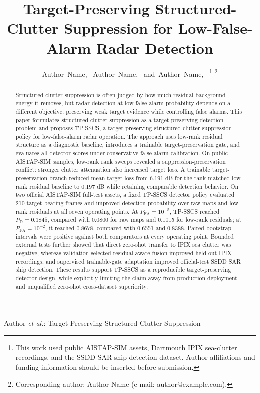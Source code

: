 \documentclass[journal]{IEEEtran}
\begin{document}
\title{Target-Preserving Structured-Clutter Suppression for Low-False-Alarm Radar Detection}

\author{Author~Name,~
        Author~Name,~
        and~Author~Name,~%
\thanks{This work used public AISTAP-SIM assets, Dartmouth IPIX sea-clutter recordings, and the SSDD SAR ship detection dataset. Author affiliations and funding information should be inserted before submission.}%
\thanks{Corresponding author: Author Name (e-mail: author@example.com).}}

%
{Author \MakeLowercase{\textit{et al.}}: Target-Preserving Structured-Clutter Suppression}

\maketitle

\begin{abstract}
Structured-clutter suppression is often judged by how much residual background energy it removes, but radar detection at low false-alarm probability depends on a different objective: preserving weak target evidence while controlling false alarms. This paper formulates structured-clutter suppression as a target-preserving detection problem and proposes TP-SSCS, a target-preserving structured-clutter suppression policy for low-false-alarm radar operation. The approach uses low-rank residual structure as a diagnostic baseline, introduces a trainable target-preservation gate, and evaluates all detector scores under conservative false-alarm calibration. On public AISTAP-SIM samples, low-rank rank sweeps revealed a suppression-preservation conflict: stronger clutter attenuation also increased target loss. A trainable target-preservation branch reduced mean target loss from 6.191 dB for the rank-matched low-rank residual baseline to 0.197 dB while retaining comparable detection behavior. On two official AISTAP-SIM full-test assets, a fixed TP-SSCS detector policy evaluated 210 target-bearing frames and improved detection probability over raw maps and low-rank residuals at all seven operating points. At $P_{\mathrm{FA}}=10^{-5}$, TP-SSCS reached $P_{\mathrm{D}}=0.1845$, compared with 0.0800 for raw maps and 0.1015 for low-rank residuals; at $P_{\mathrm{FA}}=10^{-2}$, it reached 0.8678, compared with 0.6551 and 0.8388. Paired bootstrap intervals were positive against both comparators at every operating point. Bounded external tests further showed that direct zero-shot transfer to IPIX sea clutter was negative, whereas validation-selected residual-aware fusion improved held-out IPIX recordings, and supervised trainable-gate adaptation improved official-test SSDD SAR ship detection. These results support TP-SSCS as a reproducible target-preserving detector design, while explicitly limiting the claim away from production deployment and unqualified zero-shot cross-dataset superiority.
\end{abstract}
\end{document}
